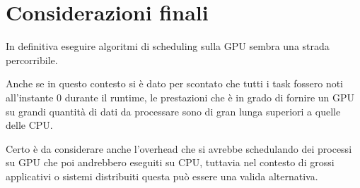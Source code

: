 \documentclass[../relazione.tex]{subfiles}
\begin{document}
\section{Considerazioni finali}
In definitiva eseguire algoritmi di scheduling sulla GPU sembra una strada percorribile.

Anche se in questo contesto si è dato per scontato che tutti i task fossero noti all'instante 0 durante il runtime, le prestazioni che è in grado di fornire un GPU su grandi quantità di dati da processare sono di gran lunga superiori a quelle delle CPU.

Certo è da considerare anche l'overhead che si avrebbe schedulando dei processi su GPU che poi andrebbero eseguiti su CPU, tuttavia nel contesto di grossi applicativi o sistemi distribuiti questa può essere una valida alternativa.
\end{document}
